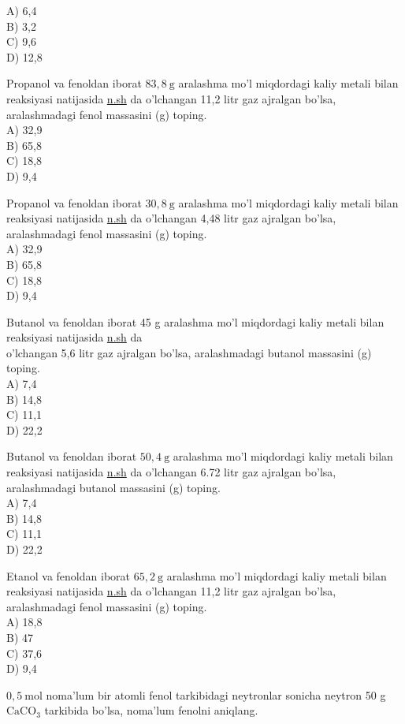 A) 6,4\\
B) 3,2\\
C) 9,6\\
D) 12,8
  \item Propanol va fenoldan iborat $83,8 \mathrm{~g}$ aralashma mo'l miqdordagi kaliy metali bilan reaksiyasi natijasida \href{http://n.sh}{n.sh} da o'lchangan 11,2 litr gaz ajralgan bo'lsa, aralashmadagi fenol massasini (g) toping.\\
A) 32,9\\
B) 65,8\\
C) 18,8\\
D) 9,4
  \item Propanol va fenoldan iborat $30,8 \mathrm{~g}$ aralashma mo'l miqdordagi kaliy metali bilan reaksiyasi natijasida \href{http://n.sh}{n.sh} da o'lchangan 4,48 litr gaz ajralgan bo'lsa, aralashmadagi fenol massasini (g) toping.\\
A) 32,9\\
B) 65,8\\
C) 18,8\\
D) 9,4
  \item Butanol va fenoldan iborat 45 g aralashma mo'l miqdordagi kaliy metali bilan reaksiyasi natijasida \href{http://n.sh}{n.sh} da\\
o'lchangan 5,6 litr gaz ajralgan bo'lsa, aralashmadagi butanol massasini (g) toping.\\
A) 7,4\\
B) 14,8\\
C) 11,1\\
D) 22,2
  \item Butanol va fenoldan iborat $50,4 \mathrm{~g}$ aralashma mo'l miqdordagi kaliy metali bilan reaksiyasi natijasida \href{http://n.sh}{n.sh} da o'lchangan 6.72 litr gaz ajralgan bo'lsa, aralashmadagi butanol massasini (g) toping.\\
A) 7,4\\
B) 14,8\\
C) 11,1\\
D) 22,2
  \item Etanol va fenoldan iborat $65,2 \mathrm{~g}$ aralashma mo'l miqdordagi kaliy metali bilan reaksiyasi natijasida \href{http://n.sh}{n.sh} da o'lchangan 11,2 litr gaz ajralgan bo'lsa, aralashmadagi fenol massasini (g) toping.\\
A) 18,8\\
B) 47\\
C) 37,6\\
D) 9,4
  \item $0,5 \mathrm{~mol}$ noma'lum bir atomli fenol tarkibidagi neytronlar sonicha neytron 50 g $\mathrm{CaCO}_{3}$ tarkibida bo'lsa, noma'lum fenolni aniqlang.\\
